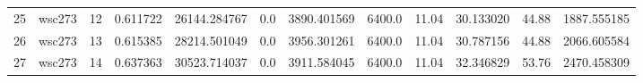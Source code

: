 \begin{tabular}{llrrrrrrrrrr}
25 &  wsc273 &        12 &  0.611722 &     26144.284767 &           0.0 &   3890.401569 &       6400.0 &             11.04 &         30.133020 &            44.88 &        1887.555185 \\
26 &  wsc273 &        13 &  0.615385 &     28214.501049 &           0.0 &   3956.301261 &       6400.0 &             11.04 &         30.787156 &            44.88 &        2066.605584 \\
27 &  wsc273 &        14 &  0.637363 &     30523.714037 &           0.0 &   3911.584045 &       6400.0 &             11.04 &         32.346829 &            53.76 &        2470.458309 \\
\bottomrule
\end{tabular}

